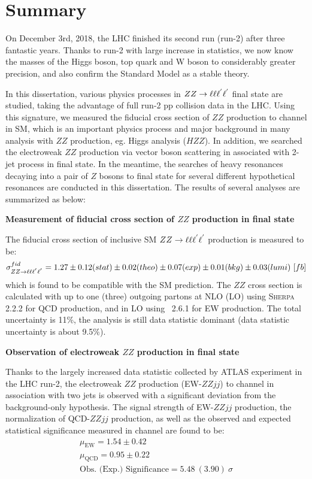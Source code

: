 \chapter{Summary}

On December 3rd, 2018, the LHC finished its second run (run-2) after three fantastic years.
Thanks to run-2 with large increase in statistics, we now know the masses of the Higgs boson, top quark and W boson to considerably greater precision,
and also confirm the Standard Model as a stable theory.

In this dissertation, various physics processes in $ZZ \rightarrow \ell\ell\ell^{'}\ell^{'}$ final state are studied, taking the advantage of full run-2 pp collision data in the LHC.
Using this signature, we measured the fiducial cross section of $ZZ$ production to \lllljj channel in SM, which is an important physics process and major background in many analysis with $ZZ$ production, eg. Higgs analysis ($HZZ$).
In addition, we searched the electroweak $ZZ$ production via vector boson scattering in associated with 2-jet process in \llll final state.
In the meantime, the searches of heavy resonances decaying into a pair of $Z$ bosons to \llll final state for several different hypothetical resonances are conducted in this dissertation.
The results of several analyses are summarized as below:

\textbf{Measurement of fiducial cross section of $ZZ$ production in \lllljj final state}

The fiducial cross section of inclusive SM $ZZ \rightarrow \ell\ell\ell^{'}\ell^{'}$ production is measured to be:
\begin{equation}
	\sigma^{fid}_{ZZ\rightarrow\ell\ell\ell^{'}\ell^{'}} = 1.27 \pm 0.12 (stat) \pm 0.02 (theo) \pm 0.07 (exp) \pm 0.01 (bkg) \pm 0.03 (lumi)~ [fb]
\end{equation}
which is found to be compatible with the SM prediction.
The $ZZ$ cross section is calculated with up to one (three) outgoing partons at NLO (LO) using \textsc{Sherpa} 2.2.2 for QCD production,
and in LO using \MGMCatNLO~2.6.1 for EW production.
The total uncertainty is 11\%, the analysis is still data statistic dominant (data statistic uncertainty is about 9.5\%).

\textbf{Observation of electroweak $ZZ$ production in \lllljj final state}

Thanks to the largely increased data statistic collected by ATLAS experiment in the LHC run-2, 
the electroweak $ZZ$ production (EW-$ZZjj$) to \llll channel in association with two jets is observed with a significant deviation from the background-only hypothesis.
The signal strength of EW-$ZZjj$ production, the normalization of QCD-$ZZjj$ production, as well as the observed and expected statistical significance measured in \lllljj channel are found to be:
\begin{equation}
\begin{split}
	\mu_{\mathrm{EW}} = 1.54 \pm 0.42 \\
	\mu_{\mathrm{QCD}} = 0.95 \pm 0.22 \\
	\text{Obs. (Exp.) Significance} = 5.48~(3.90)~\sigma
\end{split}
\end{equation}

